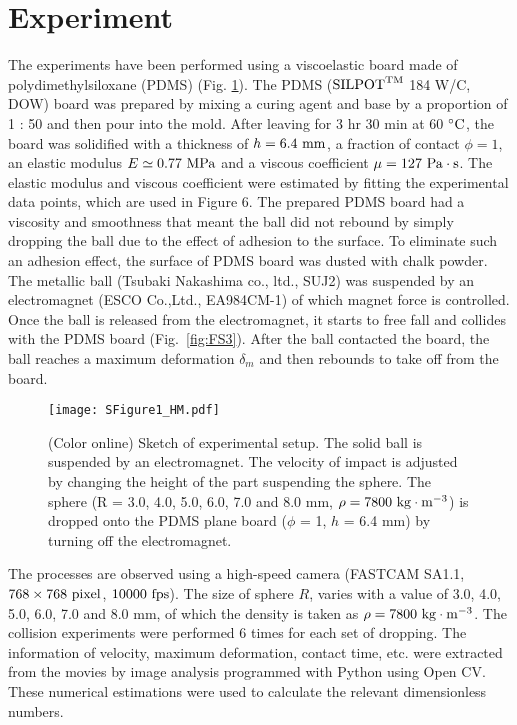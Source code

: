 \documentclass[default,iicol,10pt]{sn-jnl}%
\theoremstyle{thmstyleone}%
\theoremstyle{thmstyletwo}%
\theoremstyle{thmstylethree}%
\begin{document}
\section{Experiment}

The experiments have been performed using a viscoelastic board made of polydimethylsiloxane (PDMS)  (Fig. \ref{fig:FS1}). The PDMS (${\rm SILPOT}^{{\rm TM}}$ 184 W/C, DOW) board was prepared by mixing a curing agent and base by a proportion of 1 : 50 and then pour into the mold. After leaving for 3 hr 30 min at 60 ${\rm {}^{\circ}C}$, the board was solidified with a thickness of $h = {\rm 6.4~mm}$, a fraction of contact $\phi=1$, an elastic modulus $E \simeq 0.77~{\rm MPa}$ and a viscous coefficient $\mu = 127 ~ {\rm Pa\cdot s}$. The elastic modulus and viscous coefficient were estimated by fitting the experimental data points, which are used in Figure 6. The prepared PDMS board had a viscosity and smoothness that meant the ball did not rebound by simply dropping the ball due to the effect of adhesion to the surface. To eliminate such an adhesion effect, 
the surface of PDMS board was dusted with chalk powder. The metallic ball (Tsubaki Nakashima co., ltd.,  SUJ2) was suspended by an electromagnet (ESCO Co.,Ltd., EA984CM-1) of which magnet force is controlled. Once the ball is released from the electromagnet, it starts to free fall and collides with the PDMS board (Fig.~\ref{fig:FS3})\cite{SMExp}. After the ball contacted the board, the ball reaches a maximum deformation $\delta_m$ and then rebounds to take off from the board. 

\begin{figure}[h!]
\texttt{[image: SFigure1\_HM.pdf]}
\caption{(Color online) Sketch of experimental setup. The solid ball is suspended by an electromagnet. The velocity of impact is adjusted by changing the height of the part suspending the sphere. The sphere (R = 3.0, 4.0, 5.0, 6.0, 7.0 and 8.0 mm, $\rho = {\rm 7800~kg \cdot m^{-3}}$) is dropped onto the PDMS plane board ($\phi$ = 1, $h$ = 6.4 mm) by turning off the electromagnet. \label{fig:FS1}}
\end{figure}

The processes are observed using a high-speed camera (FASTCAM SA1.1, $768 \times 768~{\rm pixel}$, $10000~{\rm fps}$). The size of sphere $R$, varies with a value of 3.0, 4.0, 5.0, 6.0, 7.0 and 8.0 mm, of which the density is taken as $\rho = {\rm 7800~kg \cdot m^{-3}}$. The collision experiments were performed 6 times for each set of dropping. The information of velocity, maximum deformation, contact time, etc. were extracted from the movies by image analysis programmed with Python using Open CV. These numerical estimations were used to calculate the relevant dimensionless numbers.
\end{document}
